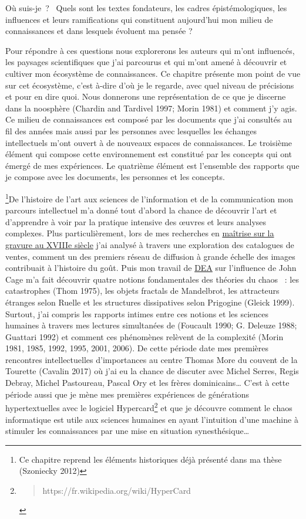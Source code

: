 \documentclass[
  letterpaper,
  DIV=11,
  numbers=noendperiod]{scrreprt}
\begin{document}
Où suis-je~? ~Quels sont les textes fondateurs, les cadres
épistémologiques, les influences et leurs ramifications qui constituent
aujourd'hui mon milieu de connaissances et dans lesquels évoluent ma
pensée ?

Pour répondre à ces questions nous explorerons les auteurs qui m'ont
influencés, les paysages scientifiques que j'ai parcourus et qui m'ont
amené à découvrir et cultiver mon écosystème de connaissances. Ce
chapitre présente mon point de vue sur cet écosystème, c'est à-dire d'où
je le regarde, avec quel niveau de précisions et pour en dire quoi. Nous
donnerons une représentation de ce que je discerne dans la noosphère
(Chardin and Tardivel 1997; Morin 1981) et comment j'y agis. Ce milieu
de connaissances est composé par les documents que j'ai consultés au fil
des années mais aussi par les personnes avec lesquelles les échanges
intellectuels m'ont ouvert à de nouveaux espaces de connaissances. Le
troisième élément qui compose cette environnement est constitué par les
concepts qui ont émergé de mes expériences. Le quatrième élément est
l'ensemble des rapports que je compose avec les documents, les personnes
et les concepts.

\footnote{Ce chapitre reprend les éléments historiques déjà présenté
  dans ma thèse (Szoniecky 2012)}De l'histoire de l'art aux sciences de
l'information et de la communication mon parcours intellectuel m'a donné
tout d'abord la chance de découvrir l'art et d'apprendre à voir par la
pratique intensive des œuvres et leurs analyses complexes. Plus
particulièrement, lors de mes recherches en
\href{http://localhost/samszo/omk/s/fiches/item/299343}{maîtrise sur la
gravure au XVIIIe siècle} j'ai analysé à travers une exploration des
catalogues de ventes, comment un des premiers réseau de diffusion à
grande échelle des images contribuait à l'histoire du goût. Puis mon
travail de \href{http://localhost/samszo/omk/s/fiches/item/299342}{DEA}
sur l'influence de John Cage m'a fait découvrir quatre notions
fondamentales des théories du chaos ~: les catastrophes (Thom 1975), les
objets fractals de Mandelbrot, les attracteurs étranges selon Ruelle et
les structures dissipatives selon Prigogine (Gleick 1999). Surtout, j'ai
compris les rapports intimes entre ces notions et les sciences humaines
à travers mes lectures simultanées de (Foucault 1990; G. Deleuze 1988;
Guattari 1992) et comment ces phénomènes relèvent de la complexité
(Morin 1981, 1985, 1992, 1995, 2001, 2006). De cette période date mes
premières rencontres intellectuelles d'importances au centre Thomas More
du couvent de la Tourette (Cavalin 2017) où j'ai eu la chance de
discuter avec Michel Serres, Regis Debray, Michel Pastoureau, Pascal Ory
et les frères dominicains\ldots{} C'est à cette période aussi que je
mène mes premières expériences de générations hypertextuelles avec le
logiciel Hypercard\footnote{\begin{quote}
  https://fr.wikipedia.org/wiki/HyperCard
  \end{quote}} et que je découvre comment le chaos informatique est
utile aux sciences humaines en ayant l'intuition d'une machine à
stimuler les connaissances par une mise en situation
synesthésique\ldots{}
\end{document}
